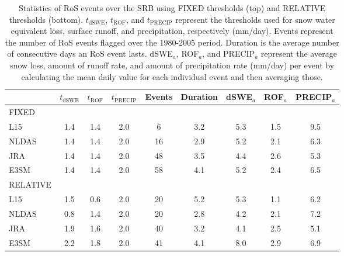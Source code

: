\documentclass[nhess, manuscript]{copernicus}
\begin{document}
\begin{table}
\caption{Statistics of RoS events over the SRB using FIXED thresholds (top) and RELATIVE thresholds (bottom). $t_{\textrm{dSWE}}$, $t_{\textrm{ROF}}$, and $t_{\textrm{PRECIP}}$ represent the thresholds used for snow water equivalent loss, surface runoff, and precipitation, respectively (mm/day). Events represent the number of RoS events flagged over the 1980-2005 period. Duration is the average number of consecutive days an RoS event lasts. dSWE$_{a}$, ROF$_{a}$, and PRECIP$_{a}$ represent the average snow loss, amount of runoff rate, and amount of precipitation rate (mm/day) per event by calculating the mean daily value for each individual event and then averaging those.}
\begin{tabular}{lcccccccc}
      &  $t_{\textrm{dSWE}}$ & $t_{\textrm{ROF}}$ & $t_{\textrm{PRECIP}}$ & Events & Duration & dSWE$_{a}$ & ROF$_{a}$ & PRECIP$_{a}$ \\ \hline
FIXED &         &         &         &     &              &              &                &                \\ \hline
L15   & 1.4     & 1.4     & 2.0     & 6   & 3.2          & 5.3          & 1.5            & 9.5            \\
NLDAS & 1.4     & 1.4     & 2.0     & 16  & 2.9          & 5.2          & 2.1            & 6.3            \\
JRA   & 1.4     & 1.4     & 2.0     & 48  & 3.5          & 4.4          & 2.6            & 5.3            \\
E3SM  & 1.4     & 1.4     & 2.0     & 58  & 4.1          & 5.2          & 2.4            & 6.5            \\ \hline
RELATIVE      &         &         &         &     &              &              &                &                \\ \hline
L15   & 1.5     & 0.6     & 2.0     & 20  & 5.2          & 5.3          & 1.1            & 6.2            \\
NLDAS & 0.8     & 1.4     & 2.0     & 20  & 2.8          & 4.2          & 2.1            & 7.2            \\
JRA   & 1.9     & 1.6     & 2.0     & 40  & 3.2          & 4.1          & 2.5            & 5.1            \\
E3SM  & 2.2     & 1.8     & 2.0     & 41  & 4.1          & 8.0          & 2.9            & 6.9 \\ \hline \hline
\end{tabular}
\label{table:means}
\end{table}
\end{document}

